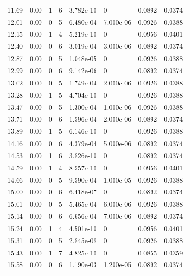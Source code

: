 \documentclass[preview]{standalone}
\begin{document}
{{{\begin{tabular}{L{1.2cm}C{1.2cm} C{0.3cm}C{0.5cm} C{1.4cm}C{1.4cm} C{1.4cm}C{1.4cm}}
  11.69  &  0.00  & 1     &  6 &  3.782e-10  & 0  & 0.0892 &  0.0374   \\ 
  12.01  &  0.00  & 0     &  5 &  6.480e-04  & 7.000e-06  & 0.0926 &  0.0388   \\ 
  12.15  &  0.00  & 1     &  4 &  5.219e-10  & 0  & 0.0956 &  0.0401   \\ 
  12.40  &  0.00  & 0     &  6 &  3.019e-04  & 3.000e-06  & 0.0892 &  0.0374   \\ 
  12.87  &  0.00  & 0     &  5 &  1.048e-05  & 0  & 0.0926 &  0.0388   \\ 
  12.99  &  0.00  & 0     &  6 &  9.142e-06  & 0  & 0.0892 &  0.0374   \\ 
  13.02  &  0.00  & 0     &  5 &  1.749e-04  & 2.000e-06  & 0.0926 &  0.0388   \\ 
  13.28  &  0.00  & 1     &  5 &  4.704e-10  & 0  & 0.0926 &  0.0388   \\ 
  13.47  &  0.00  & 0     &  5 &  1.300e-04  & 1.000e-06  & 0.0926 &  0.0388   \\ 
  13.71  &  0.00  & 0     &  6 &  1.596e-04  & 2.000e-06  & 0.0892 &  0.0374   \\ 
  13.89  &  0.00  & 1     &  5 &  6.146e-10  & 0  & 0.0926 &  0.0388   \\ 
  14.16  &  0.00  & 0     &  6 &  4.379e-04  & 5.000e-06  & 0.0892 &  0.0374   \\ 
  14.53  &  0.00  & 1     &  6 &  3.826e-10  & 0  & 0.0892 &  0.0374   \\ 
  14.59  &  0.00  & 1     &  4 &  8.557e-10  & 0  & 0.0956 &  0.0401   \\ 
  14.66  &  0.00  & 0     &  5 &  9.590e-04  & 1.000e-05  & 0.0926 &  0.0388   \\ 
  15.00  &  0.00  & 0     &  6 &  6.418e-07  & 0  & 0.0892 &  0.0374   \\ 
  15.01  &  0.00  & 0     &  5 &  5.465e-04  & 6.000e-06  & 0.0926 &  0.0388   \\ 
  15.14  &  0.00  & 0     &  6 &  6.656e-04  & 7.000e-06  & 0.0892 &  0.0374   \\ 
  15.24  &  0.00  & 1     &  4 &  4.501e-10  & 0  & 0.0956 &  0.0401   \\ 
  15.31  &  0.00  & 0     &  5 &  2.845e-08  & 0  & 0.0926 &  0.0388   \\ 
  15.43  &  0.00  & 1     &  7 &  4.825e-10  & 0  & 0.0855 &  0.0359   \\ 
  15.58  &  0.00  & 0     &  6 &  1.190e-03  & 1.200e-05  & 0.0892 &  0.0374   \\ 

\end{tabular}}}}
\end{document}
